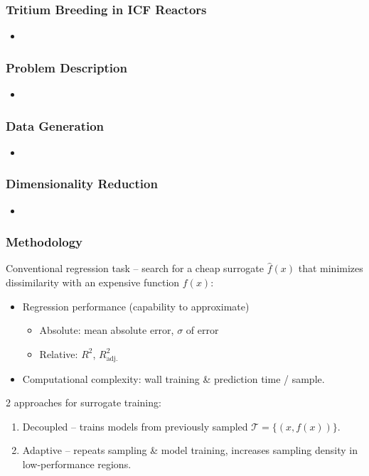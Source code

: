 \begin{frame}
	\frametitle{Tritium Breeding in ICF Reactors}
	\begin{itemize}
		\item %
	\end{itemize}
\end{frame}

\begin{frame}
	\frametitle{Problem Description}
	\begin{itemize}
		\item %
	\end{itemize}
\end{frame}

\begin{frame}
	\frametitle{Data Generation}
	\begin{itemize}
		\item %
	\end{itemize}
\end{frame}

\begin{frame}
	\frametitle{Dimensionality Reduction}
	\begin{itemize}
		\item %
	\end{itemize}
\end{frame}

\begin{frame}
	\frametitle{Methodology}
			Conventional regression task -- search for a cheap surrogate $\hat{f}(x)$ that
			minimizes dissimilarity with an expensive function $f(x)$:

			\begin{itemize}
				\item
					Regression performance (capability to approximate)
					\begin{itemize}
						\item Absolute: mean absolute error, $\sigma$ of error
						\item Relative: $R^2$, $R^2_\text{adj.}$
					\end{itemize}
				\item
					Computational complexity:
					wall training \& prediction time / sample.
			\end{itemize}

			2 approaches for surrogate training:
			\begin{enumerate}
				\item
					Decoupled -- trains models from previously sampled
					$\mathcal{T}=\{(x,f(x))\}$.
				\item
					Adaptive -- repeats sampling \& model training, increases
					sampling density in low-performance regions.
			\end{enumerate}
\end{frame}

